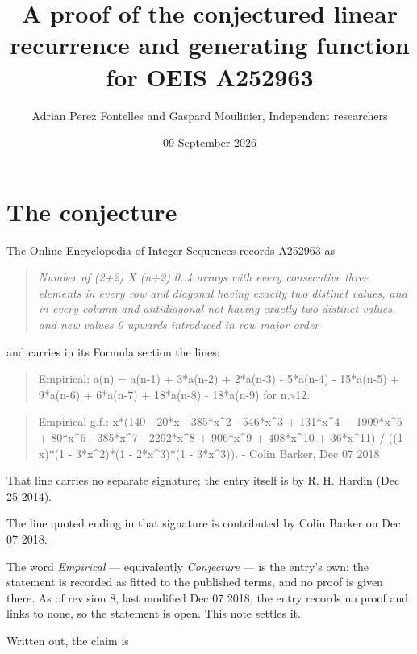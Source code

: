 \documentclass[11pt]{article}
\title{A proof of the conjectured linear recurrence and generating function for OEIS A252963}
\author{Adrian Perez Fontelles and Gaspard Moulinier, Independent researchers}
\date{09 September 2026}
\theoremstyle{definition}
\begin{document}
\maketitle
\section{The conjecture}

The Online Encyclopedia of Integer Sequences records \href{https://oeis.org/A252963}{A252963} as

\begin{quote}\itshape Number of (2+2) X (n+2) 0..4 arrays with every consecutive three elements in every row and diagonal having exactly two distinct values, and in every column and antidiagonal not having exactly two distinct values, and new values 0 upwards introduced in row major order\end{quote}

and carries in its Formula section the lines:

\begin{quote}\ttfamily Empirical: a(n) = a(n-1) + 3*a(n-2) + 2*a(n-3) - 5*a(n-4) - 15*a(n-5) + 9*a(n-6) + 6*a(n-7) + 18*a(n-8) - 18*a(n-9) for n>12.\end{quote}

\begin{quote}\ttfamily Empirical g.f.: x*(140 - 20*x - 385*x\textasciicircum{}2 - 546*x\textasciicircum{}3 + 131*x\textasciicircum{}4 + 1909*x\textasciicircum{}5 + 80*x\textasciicircum{}6 - 385*x\textasciicircum{}7 - 2292*x\textasciicircum{}8 + 906*x\textasciicircum{}9 + 408*x\textasciicircum{}10 + 36*x\textasciicircum{}11) / ((1 - x)*(1 - 3*x\textasciicircum{}2)*(1 - 2*x\textasciicircum{}3)*(1 - 3*x\textasciicircum{}3)). - Colin Barker, Dec 07 2018\end{quote}

That line carries no separate signature; the entry itself is by R. H. Hardin (Dec 25 2014).

The line quoted ending in that signature is contributed by Colin Barker on Dec 07 2018.

The word {\itshape Empirical} --- equivalently {\itshape Conjecture} --- is the entry's own: the statement is recorded as fitted to the published terms, and no proof is given there. As of revision 8, last modified Dec 07 2018, the entry records no proof and links to none, so the statement is open. This note settles it.

Written out, the claim is
\end{document}
